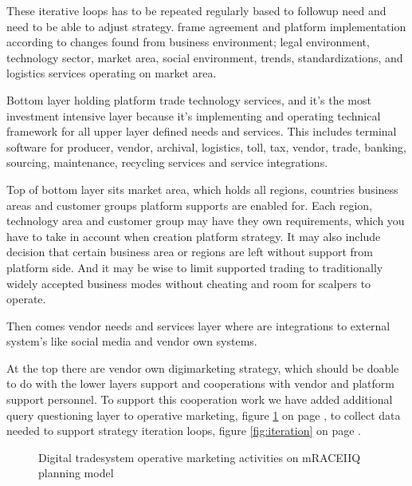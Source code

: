 These iterative loops has to be repeated regularly based to followup need and need to be able to adjust strategy. frame agreement and platform implementation according to changes found from business environment; legal environment, technology sector, market area, social environment, trends, standardizations, and logistics services operating on market area.

Bottom layer holding platform trade technology services, and it's the most investment intensive layer because it's implementing and operating technical framework for all upper layer defined needs and services. This includes terminal software for producer, vendor, archival, logistics, toll, tax, vendor, trade, banking, sourcing, maintenance, recycling services and service integrations.

Top of bottom layer sits market area, which holds all regions, countries business areas and customer groups platform supports are enabled for. Each region, technology area and customer group may have they own requirements, which you have to take in account when creation platform strategy. It may also include decision that certain business area or regions are left without support from platform side. And it may be wise to limit supported trading to traditionally widely accepted business modes without cheating and room for scalpers to operate.

Then comes vendor needs and services layer where are integrations to external system's like social media and vendor own systems.

At the top there are vendor own digimarketing strategy, which should be doable to do with the lower layers support and cooperations with vendor and platform support personnel. To support this cooperation work we have added additional query questioning layer to operative marketing, figure \ref{fig:mRACEIIQ} on page \pageref{fig:mRACEIIQ}, to collect data needed to support strategy iteration loops, figure \ref{fig:iteration} on page \pageref{fig:iteration}.


\begin{figure} %
 \begin{center}
  \caption{Digital tradesystem operative marketing activities on mRACEIIQ planning model}
  \label{fig:mRACEIIQ}
 \end{center}
\end{figure}


